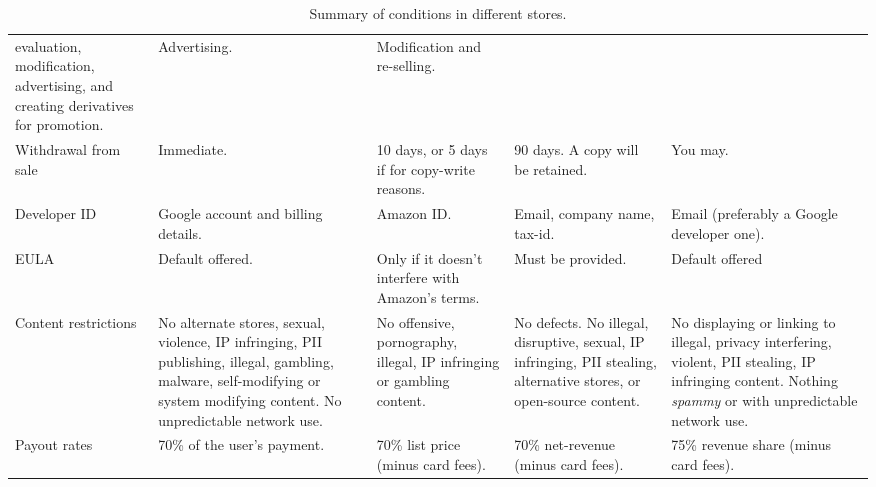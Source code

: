 \documentclass[thesis.tex]{subfiles}
\begin{document}
\begin{table*}
\begin{tabulary}{\linewidth}{lLLLL}
    evaluation, modification, advertising, and creating derivatives for
    promotion. & Advertising. & Modification and re-selling.\\
    Withdrawal from sale & Immediate. & 10 days, or 5 days if for copy-write
    reasons. & 90 days. A copy will be retained. & You may.\\
    Developer ID & Google account and billing details. & Amazon ID. & Email,
    company name, tax-id. & Email (preferably a Google developer
    one).\\
    EULA & Default offered. & Only if it doesn't interfere with Amazon's
    terms. & Must be provided. & Default offered\\
    Content restrictions & No alternate stores, sexual, violence, IP
    infringing, PII publishing, illegal, gambling, malware, self-modifying
    or system modifying content. No unpredictable network use. & No
    offensive, pornography, illegal, IP infringing or gambling content. & No
    defects. No illegal, disruptive, sexual, IP infringing, PII stealing,
    alternative stores, or open-source content. & No displaying or linking
    to illegal, privacy interfering, violent, PII stealing, IP infringing
    content. Nothing \emph{spammy} or with unpredictable network
    use.\\
    Payout rates & 70\% of the user's payment. & 70\% list price (minus card
    fees). & 70\% net-revenue (minus card fees). & 75\% revenue share (minus
    card fees).\\
    \bottomrule
  \end{tabulary}
  \label{tab:store-tandcs}
  \caption{Summary of conditions in different stores.}
\end{table*}
\end{document}
